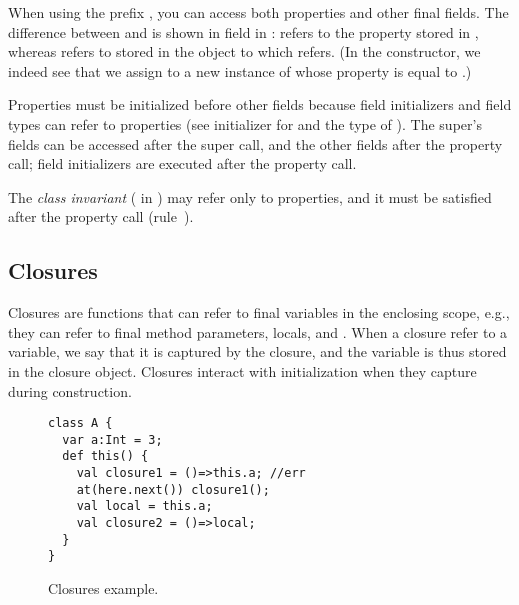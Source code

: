 When using the prefix \this, you can access both properties and other final fields.
The difference between \this and  is
    shown in field  in :
     refers to the property  stored in \this,
    whereas  refers to  stored in the object to which  refers.
(In the constructor, we indeed see that we assign to  a new instance of 
    whose  property is equal to .)


Properties must be initialized before other fields because
    field initializers and field types can refer to properties (see initializer for  and the type of ).
The super's fields can be accessed after the super call,
    and the other fields after the property call;
    field initializers are executed after the property call.

The \emph{class invariant} ( in )
    may refer only to properties,
    and it must be satisfied after the property call (rule~).



\subsection{Closures}
Closures are functions that can refer to final variables in the enclosing scope,
    e.g., they can refer to final method parameters, locals, and \this.
When a closure refer to a variable, we say that it is captured by the closure,
    and the variable is thus stored in the closure object.
Closures interact with initialization when they capture \this during construction.

\begin{figure}
\begin{lstlisting}
class A {
  var a:Int = 3;
  def this() {
    val closure1 = ()=>this.a; //err
    at(here.next()) closure1();
    val local = this.a;
    val closure2 = ()=>local;
  }
}
\end{lstlisting}
\caption{Closures example.
    }
\label{Figure:Closures}
\end{figure}


